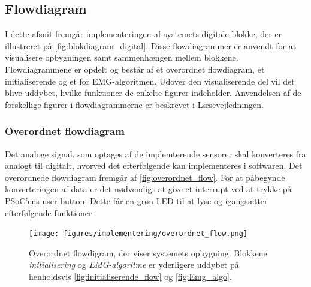 \subsection{Flowdiagram}
I dette afsnit fremgår implementeringen af systemets digitale blokke, der er illustreret på \autoref{fig:blokdiagram_digital}. Disse flowdiagrammer er anvendt for at visualisere opbygningen samt sammenhængen mellem blokkene. Flowdiagrammene er opdelt og består af et overordnet flowdiagram, et initialiserende og et for EMG-algoritmen. Udover den visualiserende del vil det blive uddybet, hvilke funktioner de enkelte figurer indeholder. Anvendelsen af de forskellige figurer i flowdiagrammerne er beskrevet i Læsevejledningen.

\subsubsection{Overordnet flowdiagram}
Det analoge signal, som optages af de implemterende sensorer skal konverteres fra analogt til digitalt, hvorved det efterfølgende kan implementeres i softwaren. Det overordnede flowdiagram fremgår af \autoref{fig:overordnet_flow}. For at påbegynde konverteringen af data er det nødvendigt at give et interrupt ved at trykke på PSoC'ens user button. Dette får en grøn LED til at lyse og igangsætter efterfølgende funktioner. 
\begin{figure}[H]
\centering
\texttt{[image: figures/implementering/overordnet\_flow.png]}
\caption{Overordnet flowdigram, der viser systemets opbygning. Blokkene \emph{initialisering} og \emph{EMG-algoritme} er yderligere uddybet på henholdsvis \autoref{fig:initialiserende_flow} og \autoref{fig:Emg_algo}.}
\label{fig:overordnet_flow}
\end{figure}

